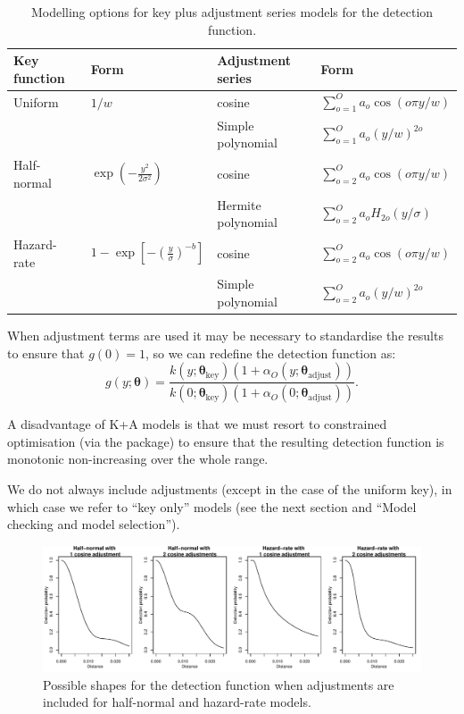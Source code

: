 \documentclass[article]{jss}
\begin{document}
\begin{table}
\caption{Modelling options for key plus adjustment series models for the detection function.}
\begin{tabular}{llll}
\hline
Key function   & Form   & Adjustment series & Form\\
\hline
 Uniform  & $1/w$   & cosine  & $\sum_{o=1}^O a_o \cos(o \pi y/w)$ \\
 & & Simple polynomial & $\sum_{o=1}^O a_o (y/w)^{2o}$ \\
 Half-normal  & $\exp\left(-\frac{y^2}{2 \sigma^2}\right)$ & cosine  & $\sum_{o=2}^O a_o \cos(o \pi y/w)$ \\
 & & Hermite polynomial & $\sum_{o=2}^O a_o H_{2o}(y/\sigma)$ \\
 Hazard-rate  & $1-\exp\left[-\left(\frac{y}{\sigma}\right)^{-b}\right]$ & cosine  & $\sum_{o=2}^O a_o \cos(o \pi y/w)$ \\
 & & Simple polynomial & $\sum_{o=2}^O a_o (y/w)^{2o}$ \\
\hline
\end{tabular}
\label{tab:keyadj}
\end{table}

When adjustment terms are used it may be necessary to standardise the
results to ensure that \(g(0)=1\), so we can redefine the detection
function as: \[
g(y; \boldsymbol{\theta}) = \frac{k(y; \boldsymbol{\theta}_\text{key})\left( 1+ \alpha_O(y; \boldsymbol{\theta}_\text{adjust})\right)}{k(0; \boldsymbol{\theta}_\text{key})\left( 1+ \alpha_O(0; \boldsymbol{\theta}_\text{adjust})\right)}.
\]

A disadvantage of K+A models is that we must resort to constrained
optimisation (via the  package) to ensure that the resulting
detection function is monotonic non-increasing over the whole range.

We do not always include adjustments (except in the case of the uniform
key), in which case we refer to ``key only'' models (see the next
section and ``Model checking and model selection'').

\begin{CodeChunk}
\begin{figure}

{\centering \includegraphics{paper_files/figure-latex/adjust-mix-comp-1} 

}

\caption{Possible shapes for the detection function when adjustments are included for half-normal and hazard-rate models.\label{fig:keyadj}}\label{fig:adjust-mix-comp}
\end{figure}
\end{CodeChunk}
\end{document}
